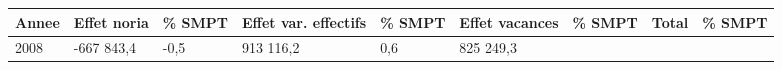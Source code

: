 \begin{longtable}[]{@{}lllllllll@{}}
\toprule
\begin{minipage}[b]{0.05\columnwidth}\raggedright
Annee\strut
\end{minipage} & \begin{minipage}[b]{0.10\columnwidth}\raggedright
Effet noria\strut
\end{minipage} & \begin{minipage}[b]{0.06\columnwidth}\raggedright
\% SMPT\strut
\end{minipage} & \begin{minipage}[b]{0.16\columnwidth}\raggedright
Effet var. effectifs\strut
\end{minipage} & \begin{minipage}[b]{0.06\columnwidth}\raggedright
\% SMPT\strut
\end{minipage} & \begin{minipage}[b]{0.12\columnwidth}\raggedright
Effet vacances\strut
\end{minipage} & \begin{minipage}[b]{0.06\columnwidth}\raggedright
\% SMPT\strut
\end{minipage} & \begin{minipage}[b]{0.10\columnwidth}\raggedright
Total\strut
\end{minipage} & \begin{minipage}[b]{0.06\columnwidth}\raggedright
\% SMPT\strut
\end{minipage}\tabularnewline
\midrule
\endhead
\begin{minipage}[t]{0.05\columnwidth}\raggedright
2008\strut
\end{minipage} & \begin{minipage}[t]{0.10\columnwidth}\raggedright
-667 843,4\strut
\end{minipage} & \begin{minipage}[t]{0.06\columnwidth}\raggedright
-0,5\strut
\end{minipage} & \begin{minipage}[t]{0.16\columnwidth}\raggedright
913 116,2\strut
\end{minipage} & \begin{minipage}[t]{0.06\columnwidth}\raggedright
0,6\strut
\end{minipage} & \begin{minipage}[t]{0.12\columnwidth}\raggedright
825 249,3\strut
\end{minipage} & \begin{minipage}[t]{0.06\columnwidth}\raggedright

\end{minipage}
\end{longtable}
